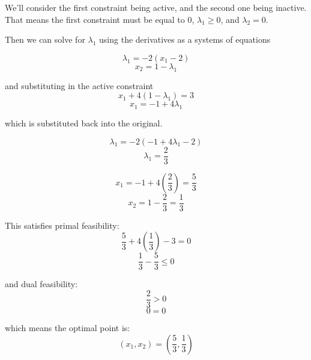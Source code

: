 \documentclass[11pt]{article}
\begin{document}
We'll consider the first constraint being active, and the second one
being inactive. That means the first constraint must be equal to 0,
\(\lambda_1 \geq 0\), and \(\lambda_2 = 0\).

Then we can solve for \(\lambda_1\) using the derivatives as a systems
of equations

\[\lambda_1 = -2(x_1 - 2)\] \[x_2 = 1 - \lambda_1\]

and substituting in the active constraint \[x_1 + 4(1 - \lambda_1) = 3\]
\[x_1 = -1 + 4 \lambda_1\]

which is substituted back into the original.

\[\lambda_1 = -2(-1 + 4\lambda_1 - 2)\] \[\lambda_1 = \frac{2}{3}\]

\[x_1 = -1 + 4\left(\frac{2}{3}\right) = \frac{5}{3}\]
\[x_2 = 1 - \frac{2}{3} = \frac{1}{3}\]

This satisfies primal feasibility:
\[\frac{5}{3} + 4\left(\frac{1}{3}\right) - 3 = 0\]
\[\frac{1}{3} - \frac{5}{3} \leq 0\]

and dual feasibility: \[\frac{2}{3} > 0\] \[0 = 0\]

which means the optimal point is:
\[(x_1, x_2) = \left(\frac{5}{3}, \frac{1}{3}\right)\]
\end{document}
